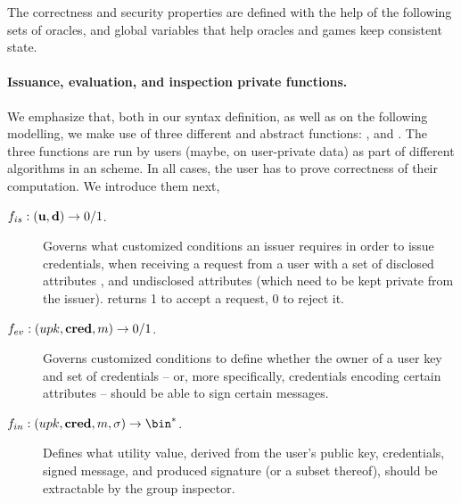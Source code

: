 The correctness and security properties are defined with the help of the
following sets of oracles, and global variables that help oracles and games
keep consistent state.

\paragraph{Issuance, evaluation, and inspection private functions.} %
We emphasize that, both in our syntax definition, as well as on the following
modelling, we make use of three different and abstract functions: \fissue,
\feval and \finsp. The three functions are run by users (maybe, on user-private
data) as part of different algorithms in an \UAS scheme. In all cases, the
user has to prove correctness of their computation. We introduce them next,

\begin{description}
\item[$f_{is}: (\mathbf{u},\mathbf{d}) \rightarrow 0/1$.] Governs what customized
  conditions an issuer requires in order to issue credentials, when receiving
  a request from a user with a set of disclosed attributes \dattrs, and
  undisclosed attributes \uattrs (which need to be kept private from the
  issuer). \fissue returns 1 to accept a request, 0 to reject it.  
\item[$f_{ev}: (upk,\mathbf{cred},m) \rightarrow 0/1$.] Governs customized
  conditions to define whether the owner of a user key and set of credentials --
  or, more specifically, credentials encoding certain attributes -- should be
  able to sign certain messages.
\item[$\finsp: (\upk,\scred,\msg,\sig) \rightarrow \bin^*$.] Defines what
  utility value, derived from the user's public key, credentials, signed
  message, and produced signature (or a subset thereof), should be extractable
  by the group inspector.
\end{description}

